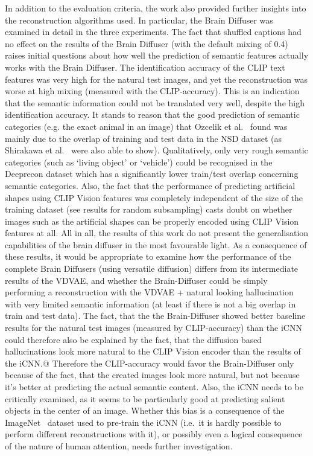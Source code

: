 In addition to the evaluation criteria, the work also provided further insights into the reconstruction algorithms used. In particular, the Brain Diffuser was examined in detail in the three experiments. The fact that shuffled captions had no effect on the results of the Brain Diffuser (with the default mixing of 0.4) raises initial questions about how well the prediction of semantic features actually works with the Brain Diffuser. The identification accuracy of the CLIP text features was very high for the natural test images, and yet the reconstruction was worse at high mixing (measured with the CLIP-accuracy). This is an indication that the semantic information could not be translated very well, despite the high identification accuracy. It stands to reason that the good prediction of semantic categories (e.g. the exact animal in an image) that Ozcelik et al.~\cite{ozcelikNaturalSceneReconstruction2023} found was mainly due to the overlap of training and test data in the NSD dataset (as Shirakawa et al.~\cite{shirakawaSpuriousReconstructionBrain2024} were also able to show). Qualitatively, only very rough semantic categories (such as `living object' or `vehicle') could be recognised in the Deeprecon dataset which has a significantly lower train/test overlap concerning semantic categories. Also, the fact that the performance of predicting artificial shapes using CLIP Vision features was completely independent of the size of the training dataset (see results for random subsampling) casts doubt on whether images such as the artificial shapes can be properly encoded using CLIP Vision features at all. All in all, the results of this work do not present the generalisation capabilities of the brain diffuser in the most favourable light. As a consequence of these results, it would be appropriate to examine how the performance of the complete Brain Diffusers (using versatile diffusion) differs from its intermediate results of the VDVAE, and whether the Brain-Diffuser could be simply performing a reconstruction with the VDVAE + natural looking hallucination with very limited semantic information (at least if there is not a big overlap in train and test data). The fact, that the the Brain-Diffuser showed better baseline results for the natural test images (measured by CLIP-accuracy) than the iCNN could therefore also be explained by the fact, that the diffusion based hallucinations look more natural to the CLIP Vision encoder than the results of the iCNN.@ Therefore the CLIP-accuracy would favor the Brain-Diffuser only because of the fact, that the created images look more natural, but not because it's better at predicting the actual semantic content. Also, the iCNN needs to be critically examined, as it seems to be particularly good at predicting salient objects in the center of an image. Whether this bias is a consequence of the ImageNet~\cite{dengImageNetLargescaleHierarchical2009} dataset used to pre-train the iCNN (i.e.\ it is hardly possible to perform different reconstructions with it), or possibly even a logical consequence of the nature of human attention, needs further investigation.


